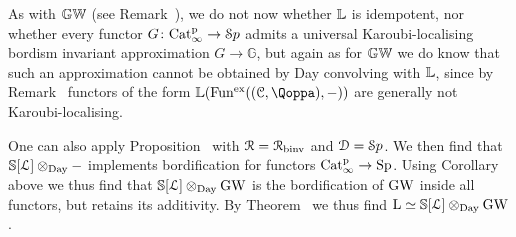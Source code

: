 \begin{remark}
\label{remark:KL-not-convolving}%
As with $\mathbb{GW}$ (see Remark~), we do not now whether $\mathbb{L}$ is idempotent, nor whether every functor $G\colon \mathrm{Cat}^{\mathrm p}_\infty \to {\mathcal Sp}$ admits a universal Karoubi-localising bordism invariant 
approximation $G \to \mathbb{G}$, but again as for $\mathbb{GW}$ we do know that such an approximation cannot be obtained by Day convolving with $\mathbb{L}$, since by Remark~ functors of the form $\KL(\Funx((\C,\QF),-))$ are generally not Karoubi-localising. 
\end{remark}




\begin{remark}
One can also apply Proposition~
with $\mathcal{R} = \mathcal{R}_{\mathrm{binv}}$ and $\mathcal{D}={\mathcal Sp}$. We then find that $\mathbb{S}[\operatorname{\mathcal{L}}] \otimes_{\mathrm{Day}} -$ implements bordification for functors $\mathrm{Cat}^{\mathrm p}_\infty \rightarrow \mathrm{Sp}$. Using Corollary  above we thus find that $\mathbb{S}[\operatorname{\mathcal{L}}] \otimes_{\mathrm{Day}} \operatorname{GW}$ is the bordification of $\operatorname{GW}$ inside all functors, but retains its additivity. By Theorem~ we thus find $\operatorname L \simeq \mathbb{S}[\operatorname{\mathcal{L}}] \otimes_{\mathrm{Day}} \operatorname{GW}$.
\end{remark}



	



